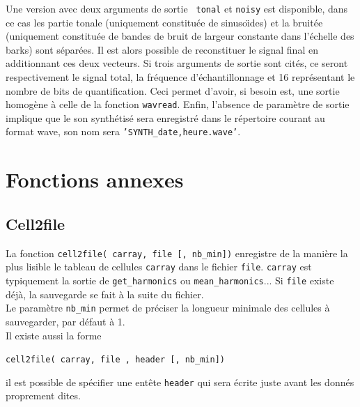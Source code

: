     Une version avec deux arguments de sortie {\tt
    tonal} et {\tt noisy} est disponible, dans ce cas
    les partie tonale (uniquement constitu{\'e}e de sinuso{\"\i}des) et la
    bruit{\'e}e (uniquement constitu{\'e}e de bandes de bruit de
    largeur constante dans l'{\'e}chelle des barks) sont s{\'e}par{\'e}es. Il est alors
    possible de reconstituer le signal final en additionnant ces
    deux vecteurs. Si trois arguments de sortie sont cit{\'e}s, ce
    seront respectivement le signal total, la fr{\'e}quence
    d'{\'e}chantillonnage et 16 repr{\'e}sentant le nombre de bits de
    quantification. Ceci permet d'avoir, si besoin est, une sortie
    homog{\`e}ne {\`a} celle de la fonction {\tt wavread}. Enfin,
    l'absence de param{\`e}tre de sortie implique que le son
    synth{\'e}tis{\'e} sera enregistr{\'e} dans le r{\'e}pertoire courant au
    format wave, son nom sera {\tt 'SYNTH\_date,heure.wave'}.



\newpage
\section{Fonctions annexes}
\label{secannexes}


    \bigskip
    \subsection{Cell2file}
    \label{cell2file}
    La fonction {\tt cell2file( carray, file [, nb\_min])}
    enregistre de la mani{\`e}re la plus lisible le tableau de
    cellules {\tt carray} dans le fichier {\tt file}. {\tt carray}
    est typiquement la sortie de {\tt get\_harmonics} ou {\tt mean\_harmonics}...
    Si {\tt file} existe d{\'e}j{\`a}, la sauvegarde se fait {\`a} la suite
    du fichier.\\

    Le param{\`e}tre {\tt nb\_min} permet de pr{\'e}ciser la longueur
    minimale des cellules {\`a} sauvegarder, par d{\'e}faut {\`a} 1.\\

    Il existe aussi la forme
    \begin{center}
    {\tt cell2file( carray, file , header [, nb\_min])}
    \end{center}
    \noindent il est possible de sp{\'e}cifier une ent{\^e}te {\tt header} qui sera
    {\'e}crite juste avant les donn{\'e}s proprement dites.\\

